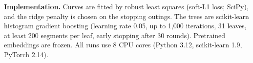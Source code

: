 \textbf{Implementation.} Curves are fitted by robust least squares
(soft-L1 loss; SciPy), and the ridge penalty is chosen on the stopping
outings. The trees are scikit-learn histogram gradient boosting (learning
rate 0.05, up to 1,000 iterations, 31 leaves, at least 200 segments per
leaf, early stopping after 30 rounds). Pretrained embeddings are frozen.
All runs use 8 CPU cores (Python 3.12, scikit-learn 1.9, PyTorch 2.14).
